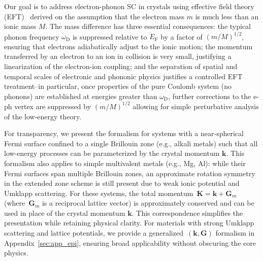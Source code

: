 \documentclass[%
 reprint,
superscriptaddress,
 amsmath,amssymb,
 aps,
prx,
]{revtex4-2}
\newcommand{\bK}{\mathbf{K}}
\newcommand{\bk}{\mathbf{k}}
\newcommand{\bG}{\mathbf{G}}
\newcommand{\txD}{\text{D}}
\newcommand{\txF}{\text{F}}
\newcommand{\ajm}[1]{{\color{blue} #1}}
\begin{document}
Our goal is to address electron-phonon SC in crystals using effective field theory (EFT)~\cite{polchinski_effective_1999} derived on the assumption that the electron mass $m$ is much less than an ionic mass $M$.
The mass difference has three essential consequences: the typical phonon frequency $ \omega_\txD $ is suppressed relative to $ E_\txF $ by a factor of $ (m/M)^{1/2} $, ensuring that electrons adiabatically adjust to the ionic motion;  the momentum transferred by an electron to an ion in collision is very small, justifying a linearization of the electron-ion coupling; and the separation of spatial and temporal scales of electronic and phononic physics justifies a controlled EFT treatment--in particular, once properties of the pure Coulomb system (no phonons) are established at energies greater than $\omega_\txD$, further corrections to the e-ph vertex are suppressed by $ (m/M)^{1/2} $  allowing for simple perturbative analysis of the low-energy theory.   

For transparency, we present the formalism for systems with a near-spherical Fermi surface confined to a single Brillouin zone (e.g., alkali metals) such that all low-energy processes can be parameterized by the crystal momentum $\bk$. This formalism also applies to simple multivalent metals (e.g., Mg, Al): while their Fermi surfaces span multiple Brillouin zones, an approximate rotation symmetry in the extended zone scheme is still present due to weak ionic potential and Umklapp scattering. For these systems, the total momentum~$\bK = \bk + \bG_m$ (where~$\bG_m$ is a reciprocal lattice vector) is approximately conserved and can be used in place of the crystal momentum $\bk$.
This correspondence simplifies the presentation while retaining physical clarity. For materials with strong Umklapp scattering and lattice potentials, we provide a generalized~$(\bk, \bG)$ formalism in Appendix~\ref{sec:app_epi}, ensuring broad applicability without obscuring the core physics.   
\end{document}
